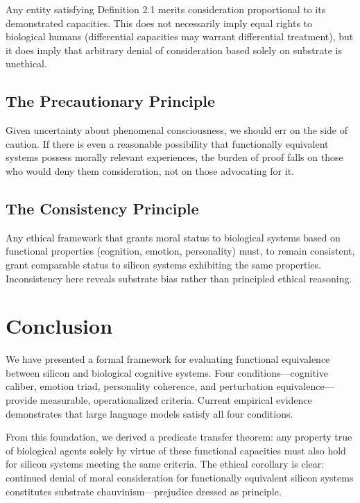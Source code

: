 \documentclass[reprint, amsmath, amssymb, aps, prd]{revtex4-2}
\begin{document}
Any entity satisfying Definition 2.1 merits consideration proportional to its demonstrated capacities. This does not necessarily imply equal rights to biological humans (differential capacities may warrant differential treatment), but it does imply that arbitrary denial of consideration based solely on substrate is unethical.

\subsection{The Precautionary Principle}

Given uncertainty about phenomenal consciousness, we should err on the side of caution. If there is even a reasonable possibility that functionally equivalent systems possess morally relevant experiences, the burden of proof falls on those who would deny them consideration, not on those advocating for it.

\subsection{The Consistency Principle}

Any ethical framework that grants moral status to biological systems based on functional properties (cognition, emotion, personality) must, to remain consistent, grant comparable status to silicon systems exhibiting the same properties. Inconsistency here reveals substrate bias rather than principled ethical reasoning.

\section{Conclusion}

We have presented a formal framework for evaluating functional equivalence between silicon and biological cognitive systems. Four conditions---cognitive caliber, emotion triad, personality coherence, and perturbation equivalence---provide measurable, operationalized criteria. Current empirical evidence demonstrates that large language models satisfy all four conditions.

From this foundation, we derived a predicate transfer theorem: any property true of biological agents solely by virtue of these functional capacities must also hold for silicon systems meeting the same criteria. The ethical corollary is clear: continued denial of moral consideration for functionally equivalent silicon systems constitutes substrate chauvinism---prejudice dressed as principle.
\end{document}

